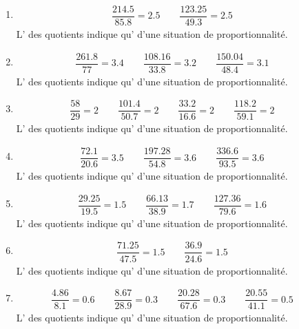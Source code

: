 {\begin{enumerate}
\item\begin{align*}
\dfrac{214.5}{85.8} = 2.5\qquad \dfrac{123.25}{49.3} = 2.5\qquad 
\end{align*}
L' des quotients indique qu' d'une situation de proportionnalité.

\item\begin{align*}
\dfrac{261.8}{77} = 3.4\qquad \dfrac{108.16}{33.8} = 3.2\qquad \dfrac{150.04}{48.4} = 3.1\qquad 
\end{align*}
L' des quotients indique qu' d'une situation de proportionnalité.

\item\begin{align*}
\dfrac{58}{29} = 2\qquad \dfrac{101.4}{50.7} = 2\qquad \dfrac{33.2}{16.6} = 2\qquad \dfrac{118.2}{59.1} = 2\qquad 
\end{align*}
L' des quotients indique qu' d'une situation de proportionnalité.

\item\begin{align*}
\dfrac{72.1}{20.6} = 3.5\qquad \dfrac{197.28}{54.8} = 3.6\qquad \dfrac{336.6}{93.5} = 3.6\qquad 
\end{align*}
L' des quotients indique qu' d'une situation de proportionnalité.

\item\begin{align*}
\dfrac{29.25}{19.5} = 1.5\qquad \dfrac{66.13}{38.9} = 1.7\qquad \dfrac{127.36}{79.6} = 1.6\qquad 
\end{align*}
L' des quotients indique qu' d'une situation de proportionnalité.

\item\begin{align*}
\dfrac{71.25}{47.5} = 1.5\qquad \dfrac{36.9}{24.6} = 1.5\qquad 
\end{align*}
L' des quotients indique qu' d'une situation de proportionnalité.

\item\begin{align*}
\dfrac{4.86}{8.1} = 0.6\qquad \dfrac{8.67}{28.9} = 0.3\qquad \dfrac{20.28}{67.6} = 0.3\qquad \dfrac{20.55}{41.1} = 0.5\qquad 
\end{align*}
L' des quotients indique qu' d'une situation de proportionnalité.


\end{enumerate}}
